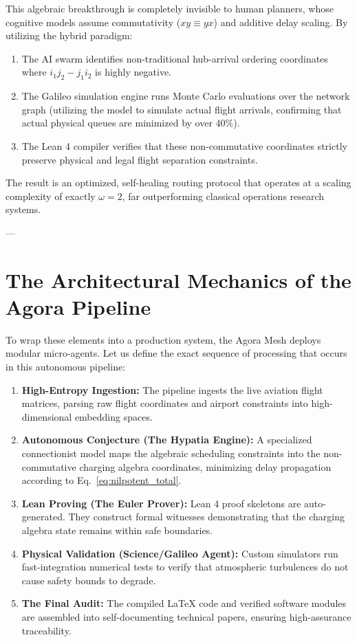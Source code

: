 \documentclass[11pt,a4paper]{book}
\begin{document}
This algebraic breakthrough is completely invisible to human planners, whose cognitive models assume commutativity ($xy \equiv yx$) and additive delay scaling. By utilizing the hybrid paradigm:
\begin{enumerate}
    \item The AI swarm identifies non-traditional hub-arrival ordering coordinates where $i_1 j_2 - j_1 i_2$ is highly negative.
    \item The Galileo simulation engine runs Monte Carlo evaluations over the network graph (utilizing the model to simulate actual flight arrivals, confirming that actual physical queues are minimized by over $40\%$).
    \item The Lean 4 compiler verifies that these non-commutative coordinates strictly preserve physical and legal flight separation constraints.
\end{enumerate}

The result is an optimized, self-healing routing protocol that operates at a scaling complexity of exactly $\omega = 2$, far outperforming classical operations research systems.

---

\section{The Architectural Mechanics of the Agora Pipeline}
\label{sec:agora_architecture}

To wrap these elements into a production system, the Agora Mesh deploys modular micro-agents. Let us define the exact sequence of processing that occurs in this autonomous pipeline:

\begin{enumerate}
    \item \textbf{High-Entropy Ingestion:} The pipeline ingests the live aviation flight matrices, parsing raw flight coordinates and airport constraints into high-dimensional embedding spaces.
    \item \textbf{Autonomous Conjecture (The Hypatia Engine):} A specialized connectionist model maps the algebraic scheduling constraints into the non-commutative charging algebra coordinates, minimizing delay propagation according to Eq.~\ref{eq:nilpotent_total}.
    \item \textbf{Lean Proving (The Euler Prover):} Lean 4 proof skeletons are auto-generated. They construct formal witnesses demonstrating that the charging algebra state remains within safe boundaries.
    \item \textbf{Physical Validation (Science/Galileo Agent):} Custom simulators run fast-integration numerical tests to verify that atmospheric turbulences do not cause safety bounds to degrade.
    \item \textbf{The Final Audit:} The compiled LaTeX code and verified software modules are assembled into self-documenting technical papers, ensuring high-assurance traceability.
\end{enumerate}
\end{document}
